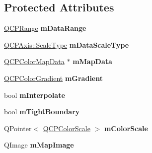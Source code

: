 \subsection*{Protected Attributes}
\begin{DoxyCompactItemize}
\item 
\hyperlink{class_q_c_p_range}{Q\+C\+P\+Range} {\bfseries m\+Data\+Range}\hypertarget{class_q_c_p_color_map_ab87609621d16cd3e9d52ad070b327b08}{}\label{class_q_c_p_color_map_ab87609621d16cd3e9d52ad070b327b08}

\item 
\hyperlink{class_q_c_p_axis_a36d8e8658dbaa179bf2aeb973db2d6f0}{Q\+C\+P\+Axis\+::\+Scale\+Type} {\bfseries m\+Data\+Scale\+Type}\hypertarget{class_q_c_p_color_map_ab28a4b2def408f83b9818799d5f18446}{}\label{class_q_c_p_color_map_ab28a4b2def408f83b9818799d5f18446}

\item 
\hyperlink{class_q_c_p_color_map_data}{Q\+C\+P\+Color\+Map\+Data} $\ast$ {\bfseries m\+Map\+Data}\hypertarget{class_q_c_p_color_map_a1fda3eb5a2c52cde39a867ea1ca3600e}{}\label{class_q_c_p_color_map_a1fda3eb5a2c52cde39a867ea1ca3600e}

\item 
\hyperlink{class_q_c_p_color_gradient}{Q\+C\+P\+Color\+Gradient} {\bfseries m\+Gradient}\hypertarget{class_q_c_p_color_map_aab77fe9a8df6f0486ab3507cc5f278fa}{}\label{class_q_c_p_color_map_aab77fe9a8df6f0486ab3507cc5f278fa}

\item 
bool {\bfseries m\+Interpolate}\hypertarget{class_q_c_p_color_map_af77e5eba9a844592648edeb6fbe834f1}{}\label{class_q_c_p_color_map_af77e5eba9a844592648edeb6fbe834f1}

\item 
bool {\bfseries m\+Tight\+Boundary}\hypertarget{class_q_c_p_color_map_ac2e9425fe4381b496726e1c09f978302}{}\label{class_q_c_p_color_map_ac2e9425fe4381b496726e1c09f978302}

\item 
Q\+Pointer$<$ \hyperlink{class_q_c_p_color_scale}{Q\+C\+P\+Color\+Scale} $>$ {\bfseries m\+Color\+Scale}\hypertarget{class_q_c_p_color_map_a3f17ad196cd49c1f3801aef27988eb7a}{}\label{class_q_c_p_color_map_a3f17ad196cd49c1f3801aef27988eb7a}

\item 
Q\+Image {\bfseries m\+Map\+Image}\hypertarget{class_q_c_p_color_map_a66110813b42eca78b64095b2a1f285a0}{}\label{class_q_c_p_color_map_a66110813b42eca78b64095b2a1f285a0}


\end{DoxyCompactItemize}
